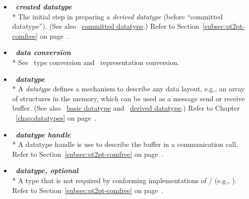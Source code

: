 \begin{itemize}
\label{glossary:created_datatype}
\item  ~\hypertarget{glossary:created_datatype}{\emph{\textbf{created datatype}}} \\*
The initial step in preparing a \emph{derived datatype} (before ``committed datatype'').
(See also ~\hyperlink{glossary:committed_datatype}{committed datatype}.)
Refer to Section~\ref{subsec:pt2pt-comfree} on page~\pageref{subsec:pt2pt-comfree}.

\label{glossary:data_conversion}
\item  ~\hypertarget{glossary:data_conversion}{\emph{\textbf{data conversion}}} \\*
See ~\hypertarget{glossary:type_conversion}{type conversion} and ~\hypertarget{glossary:representation_conversion}{representation conversion}.

\label{glossary:datatype}
\item  ~\hypertarget{glossary:datatype}{\emph{\textbf{datatype}}} \\*
A \emph{datatype} defines a mechanism to describe any data layout, e.g., an array of
structures in the memory, which can be used as a message send or receive buffer.
(See also ~\hyperlink{glossary:basic_datatype}{basic datatype} and
~\hyperlink{glossary:derived_datatype}{derived datatype}.)
Refer to Chapter ~\ref{chap:datatypes} on page~\pageref{chap:datatypes}.

\label{glossary:datatype_handle}
\item  ~\hypertarget{glossary:datatype_handle}{\emph{\textbf{datatype handle}}} \\*
A datatype handle is use to describe the buffer in a communication call.
Refer to Section~\ref{subsec:pt2pt-comfree} on page~\pageref{subsec:pt2pt-comfree}.

\label{glossary:datatype_optional}
\item  ~\hypertarget{glossary:datatype_optional}{\emph{\textbf{datatype, optional}}} \\*
A type that is not required by conforming implementations of \MPIIII/ (e.g., ).
Refer to Section~\ref{subsec:pt2pt-comfree} on page~\pageref{subsec:pt2pt-comfree}.


\end{itemize}
